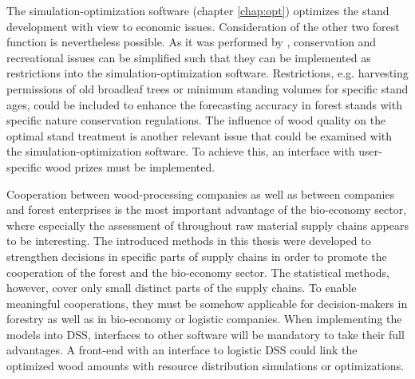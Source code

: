 The simulation-optimization software (chapter \ref{chap:opt}) optimizes the stand development with view to economic issues. Consideration of the other two forest function is nevertheless possible. As it was performed by \citet{yousefpour_2009}, conservation and recreational issues can be simplified such that they can be implemented as restrictions into the simulation-optimization software. Restrictions, e.g. harvesting permissions of old broadleaf trees or minimum standing volumes for specific stand ages, could be included to enhance the forecasting accuracy in forest stands with specific nature conservation regulations. The influence of wood quality on the optimal stand treatment is another relevant issue that could be examined with the simulation-optimization software. To achieve this, an interface with user-specific wood prizes must be implemented.

Cooperation between wood-processing companies as well as between companies and forest enterprises is the most important advantage of the bio-economy sector, where especially the assessment of throughout raw material supply chains appears to be interesting. The introduced methods in this thesis were developed to strengthen decisions in specific parts of supply chains in order to promote the cooperation of the forest and the bio-economy sector. The statistical methods, however, cover only small distinct parts of the supply chains. To enable meaningful cooperations, they must be somehow applicable for decision-makers in forestry as well as in bio-economy or logistic companies. When implementing the models into DSS, interfaces to other software will be mandatory to take their full advantages. A front-end with an interface to logistic DSS could link the optimized wood amounts with resource distribution simulations or optimizations.